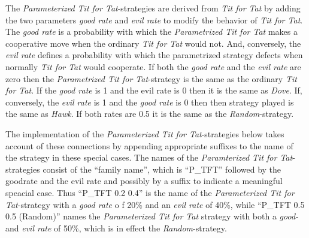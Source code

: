 The {\em Parameterized Tit for Tat}-strategies are derived from {\em Tit for
Tat} by adding the two parameters {\em good
rate} and {\em evil rate} to modify the behavior of {\em Tit for Tat}.
The {\em good rate} is a probability with which the {\em Parametrized Tit
for Tat} makes a cooperative move when the ordinary {\em Tit for Tat}
would not. And, conversely, the {\em evil rate} defines a probability with
which the parametrized strategy defects when normally {\em Tit for Tat}
would cooperate. If both the {\em good rate} and the {\em evil rate} are
zero then the {\em Parametrized Tit for Tat}-strategy is the same as the
ordinary {\em Tit for Tat}. If the {\em good rate} is 1 and the evil rate is
0 then it is the same as {\em Dove}. If, conversely, the {\em evil rate} is
1 and the {\em good rate} is 0 then then strategy played is the same as {\em
Hawk}. If both rates are 0.5 it is the same as the {\em Random}-strategy.

The implementation of the {\em Parameterized Tit for Tat}-strategies below
takes account of these connections by appending appropriate suffixes to the
name of the strategy in these special cases. The names of the {\em
  Paramterized Tit for Tat}-strategies consist of the ``family name'', which
is ``P\_TFT'' followed by the goodrate and the evil rate and possibly by a
suffix to indicate a meaningful speacial case. Thus ``P\_TFT 0.2 0.4'' is the
name of the {\em Parameterized Tit for Tat}-strategy with a {\em good rate} o
f 20\% and an {\em evil rate} of 40\%, while ``P\_TFT 0.5 0.5 (Random)'' names
the {\em Parameterized Tit for Tat} strategy with both a {\em good-} and {\em
  evil rate} of 50\%, which is in effect the {\em Random}-strategy.

